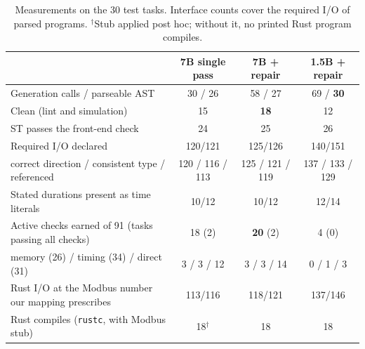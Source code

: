 \documentclass{ceurart}
\begin{document}
\begin{table}[!tb]
  \caption{Measurements on the 30 test tasks. Interface counts cover the required I/O of parsed programs. $^\dagger$Stub applied post hoc; without it, no printed Rust program compiles.}
  \label{tab:results}
  \centering\small
  \begin{tabular}{lccc}
    \toprule
                                                    & 7B single pass & 7B + repair     & 1.5B + repair \\
    \midrule
    Generation calls / parseable AST                & 30 / 26        & 58 / 27         & 69 / \textbf{30} \\
    Clean (lint and simulation)                     & 15             & \textbf{18}     & 12 \\
    ST passes the front-end check                   & 24             & 25              & 26 \\
    \midrule
    Required I/O declared                           & 120/121        & 125/126         & 140/151 \\
    \quad correct direction / consistent type / referenced & 120 / 116 / 113 & 125 / 121 / 119 & 137 / 133 / 129 \\
    Stated durations present as time literals       & 10/12          & 10/12           & 12/14 \\
    \midrule
    Active checks earned of 91 (tasks passing all checks) & 18 (2)   & \textbf{20} (2) & 4 (0) \\
    \quad memory (26) / timing (34) / direct (31)   & 3 / 3 / 12     & 3 / 3 / 14      & 0 / 1 / 3 \\
    \midrule
    Rust I/O at the Modbus number our mapping prescribes & 113/116   & 118/121         & 137/146 \\
    Rust compiles (\texttt{rustc}, with Modbus stub) & 18$^\dagger$  & 18              & 18 \\
    \bottomrule
  \end{tabular}
\end{table}
\end{document}
